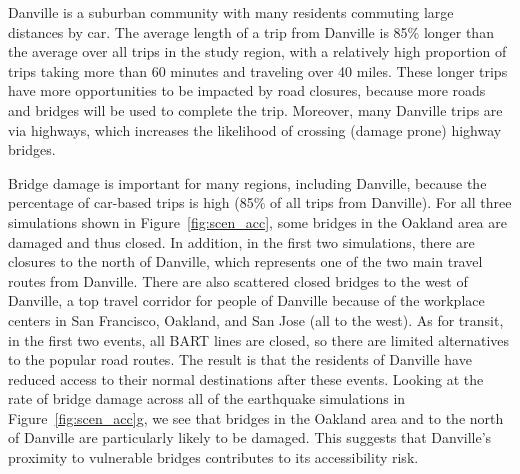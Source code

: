 
Danville is a suburban community with many residents commuting large distances by car. The average length of a trip from Danville is 85\% longer than the average over all trips in the study region, with a relatively high proportion of trips taking more than 60 minutes and traveling over 40 miles. These longer trips have more opportunities to be impacted by road closures, because more roads and bridges will be used to complete the trip. Moreover, many Danville trips are via highways, which increases the likelihood of crossing (damage prone) highway bridges. 


Bridge damage is important for many regions, including Danville, because the percentage of car-based trips is high (85\% of all trips from Danville). For all three simulations shown in Figure~\ref{fig:scen_acc}, some bridges in the Oakland area are damaged and thus closed. In addition, in the first two simulations, there are closures to the north of Danville, which represents one of the two main travel routes from Danville. There are also scattered closed bridges to the west of Danville, a top travel corridor for people of Danville because of the workplace centers in San Francisco, Oakland, and San Jose (all to the west). As for transit, in the first two events, all BART lines are closed, so there are limited alternatives to the popular road routes. The result is that the residents of Danville have reduced access to their normal destinations after these events. 
Looking at the rate of bridge damage across all of the earthquake simulations in Figure~\ref{fig:scen_acc}{g}, we see that bridges in the Oakland area and to the north of Danville are particularly likely to be damaged. This suggests that Danville's proximity to  vulnerable bridges contributes to its accessibility risk.

